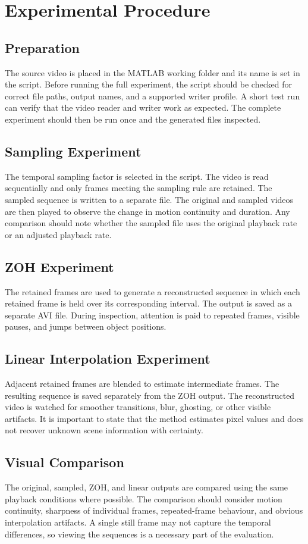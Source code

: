 \documentclass[12pt,a4paper,oneside]{report}
\begin{document}
\chapter{Experimental Procedure}
\section{Preparation}
The source video is placed in the MATLAB working folder and its name is set in the script. Before running the full experiment, the script should be checked for correct file paths, output names, and a supported writer profile. A short test run can verify that the video reader and writer work as expected. The complete experiment should then be run once and the generated files inspected.

\section{Sampling Experiment}
The temporal sampling factor is selected in the script. The video is read sequentially and only frames meeting the sampling rule are retained. The sampled sequence is written to a separate file. The original and sampled videos are then played to observe the change in motion continuity and duration. Any comparison should note whether the sampled file uses the original playback rate or an adjusted playback rate.

\section{ZOH Experiment}
The retained frames are used to generate a reconstructed sequence in which each retained frame is held over its corresponding interval. The output is saved as a separate AVI file. During inspection, attention is paid to repeated frames, visible pauses, and jumps between object positions.

\section{Linear Interpolation Experiment}
Adjacent retained frames are blended to estimate intermediate frames. The resulting sequence is saved separately from the ZOH output. The reconstructed video is watched for smoother transitions, blur, ghosting, or other visible artifacts. It is important to state that the method estimates pixel values and does not recover unknown scene information with certainty.

\section{Visual Comparison}
The original, sampled, ZOH, and linear outputs are compared using the same playback conditions where possible. The comparison should consider motion continuity, sharpness of individual frames, repeated-frame behaviour, and obvious interpolation artifacts. A single still frame may not capture the temporal differences, so viewing the sequences is a necessary part of the evaluation.
\end{document}
